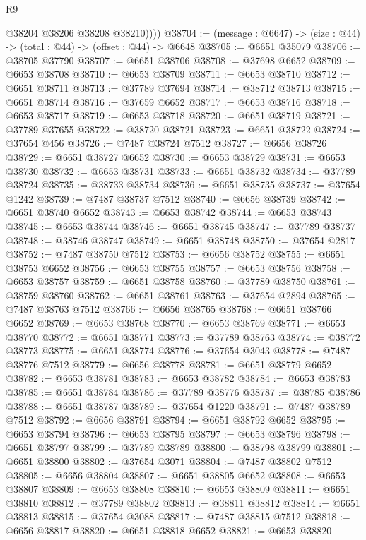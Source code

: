 \begin{lexlean}{R9}
\begin{coremodule}
            @38204
            @38206
            @38208
            @38210))))
@38704 := (message : @6647) -> (size : @44) -> (total : @44) -> (offset : @44) -> @6648
@38705 := @6651 @35079
@38706 := @38705 @37790
@38707 := @6651 @38706
@38708 := @37698 @6652
@38709 := @6653 @38708
@38710 := @6653 @38709
@38711 := @6653 @38710
@38712 := @6651 @38711
@38713 := @37789 @37694
@38714 := @38712 @38713
@38715 := @6651 @38714
@38716 := @37659 @6652
@38717 := @6653 @38716
@38718 := @6653 @38717
@38719 := @6653 @38718
@38720 := @6651 @38719
@38721 := @37789 @37655
@38722 := @38720 @38721
@38723 := @6651 @38722
@38724 := @37654 @456
@38726 := @7487 @38724 @7512
@38727 := @6656 @38726
@38729 := @6651 @38727 @6652
@38730 := @6653 @38729
@38731 := @6653 @38730
@38732 := @6653 @38731
@38733 := @6651 @38732
@38734 := @37789 @38724
@38735 := @38733 @38734
@38736 := @6651 @38735
@38737 := @37654 @1242
@38739 := @7487 @38737 @7512
@38740 := @6656 @38739
@38742 := @6651 @38740 @6652
@38743 := @6653 @38742
@38744 := @6653 @38743
@38745 := @6653 @38744
@38746 := @6651 @38745
@38747 := @37789 @38737
@38748 := @38746 @38747
@38749 := @6651 @38748
@38750 := @37654 @2817
@38752 := @7487 @38750 @7512
@38753 := @6656 @38752
@38755 := @6651 @38753 @6652
@38756 := @6653 @38755
@38757 := @6653 @38756
@38758 := @6653 @38757
@38759 := @6651 @38758
@38760 := @37789 @38750
@38761 := @38759 @38760
@38762 := @6651 @38761
@38763 := @37654 @2894
@38765 := @7487 @38763 @7512
@38766 := @6656 @38765
@38768 := @6651 @38766 @6652
@38769 := @6653 @38768
@38770 := @6653 @38769
@38771 := @6653 @38770
@38772 := @6651 @38771
@38773 := @37789 @38763
@38774 := @38772 @38773
@38775 := @6651 @38774
@38776 := @37654 @3043
@38778 := @7487 @38776 @7512
@38779 := @6656 @38778
@38781 := @6651 @38779 @6652
@38782 := @6653 @38781
@38783 := @6653 @38782
@38784 := @6653 @38783
@38785 := @6651 @38784
@38786 := @37789 @38776
@38787 := @38785 @38786
@38788 := @6651 @38787
@38789 := @37654 @1220
@38791 := @7487 @38789 @7512
@38792 := @6656 @38791
@38794 := @6651 @38792 @6652
@38795 := @6653 @38794
@38796 := @6653 @38795
@38797 := @6653 @38796
@38798 := @6651 @38797
@38799 := @37789 @38789
@38800 := @38798 @38799
@38801 := @6651 @38800
@38802 := @37654 @3071
@38804 := @7487 @38802 @7512
@38805 := @6656 @38804
@38807 := @6651 @38805 @6652
@38808 := @6653 @38807
@38809 := @6653 @38808
@38810 := @6653 @38809
@38811 := @6651 @38810
@38812 := @37789 @38802
@38813 := @38811 @38812
@38814 := @6651 @38813
@38815 := @37654 @3088
@38817 := @7487 @38815 @7512
@38818 := @6656 @38817
@38820 := @6651 @38818 @6652
@38821 := @6653 @38820

\end{coremodule}
\end{lexlean}
